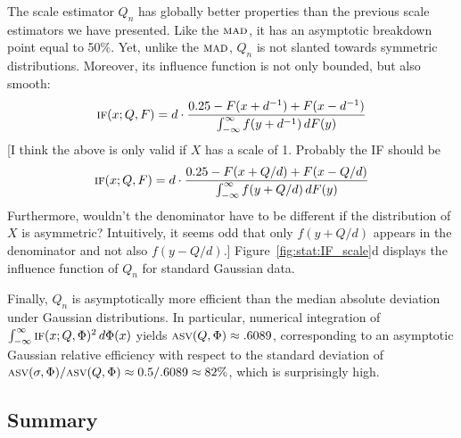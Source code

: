 The scale estimator $Q_n$ has globally better properties than the previous
scale estimators we have presented. Like the $\stsc{MAD}$, it has an asymptotic
breakdown point equal to 50\%. Yet, unlike the $\stsc{MAD}$, $Q_n$ is not
slanted towards symmetric distributions. Moreover, its influence function is
not only bounded, but also smooth:                                              
\[
    \stsc{IF}(x; Q, F) = d\cdot \frac{0.25 - F(x+d^{-1}) + F(x-d^{-1})}{\int_{-\infty}^\infty f(y+d^{-1}) \dif F(y)}
\]
\alert{[I think the above is only valid if $X$ has a scale of 1. Probably the IF should be
\[
    \stsc{IF}(x; Q, F) = d\cdot \frac{0.25 - F(x+Q/d) + F(x-Q/d)}{\int_{-\infty}^\infty f(y+Q/d) \dif F(y)}
\]
Furthermore, wouldn't the denominator have to be different if the distribution 
of $X$ is asymmetric? Intuitively, it seems odd that only $f(y+Q/d)$ appears in 
the denominator and not also $f(y-Q/d)$.]
}
Figure~\ref{fig:stat:IF_scale}d displays the influence function of $Q_n$ for 
standard Gaussian data.                                                         

Finally, $Q_n$ is asymptotically more efficient than the median absolute
deviation under Gaussian distributions. In particular, numerical integration of
$\int_{-\infty}^\infty \stsc{IF}(x;Q,\Phi)^2 \dif \Phi(x)$ yields
$\stsc{ASV}(Q,\Phi) \approx .6089$, corresponding to an asymptotic Gaussian        
relative efficiency with respect to the standard deviation of
$\stsc{ASV}(\sigma, \Phi) / \stsc{ASV}(Q, \Phi) \approx 0.5/.6089 \approx 82\%$,
which is surprisingly high.

\begin{stlog}

\end{stlog}

\subsection{Summary}

